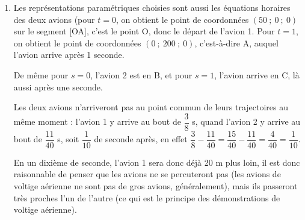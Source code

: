 \documentclass[10pt]{article}
\providecommand{\no}{{\text{n°}}}
\begin{document}
\begin{enumerate}
$\begin{aligned} \begin{cases}	0 = -33 + 120s\\200t = 75\\0 = 44 - 160s\end{cases}
&\iff \begin{cases}	120s = 33\\t = \dfrac{75}{200}\\160s = 44\end{cases}\\
&\iff \begin{cases}	s = \dfrac{33}{120}\\t = \dfrac{3}{8}\\s = \dfrac{44}{160}\end{cases} \\
&\iff \begin{cases}	s = \dfrac{11}{40}\\t = \dfrac{3}{8}\\s = \dfrac{11}{40}\end{cases} \\ \end{aligned}$

Le système a effectivement une unique solution, les deux trajectoires ont donc bien un point commun, qui est le point de paramètre $t = \dfrac{3}{8}$ sur [0A], qui est aussi le point de paramètre $s = \dfrac{11}{40}$ sur [BC], c'est le point de coordonnées $(0~;~75~;~0)$.


\item Les représentations paramétriques choisies sont aussi les équations horaires des deux avions (pour $t = 0$, on obtient le point de coordonnées $(50~;~0~;~0)$ sur le segment [OA], c'est le point O, donc le départ de l'avion 1. Pour $t = 1$, on obtient le point de coordonnées $(0~;~200~;~0)$, c'est-à-dire A, auquel l'avion arrive après 1 seconde.

De même pour $s = 0$, l'avion \no 2 est en B, et pour $s=1$, l'avion arrive en C, là aussi après une seconde.

Les deux avions n'arriveront pas au point commun de leurs trajectoires au même moment : l'avion \no 1 y arrive au bout de $\dfrac{3}{8}$ s, quand l'avion \no 2 y arrive au bout de $\dfrac{11}{40}$ s, soit $\dfrac{1}{10}$ de seconde après, en effet $\dfrac{3}{8} - \dfrac{11}{40} = \dfrac{15}{40} - \dfrac{11}{40} = \dfrac{4}{40} = \dfrac{1}{10}$.

En un dixième de seconde, l'avion \no 1 sera donc déjà 20 m plus loin, il est donc raisonnable de penser que les avions ne se percuteront pas (les avions de voltige aérienne ne sont pas de gros avions, généralement), mais ils passeront très proches l'un de l'autre (ce qui est le principe des démonstrations de voltige aérienne).
\end{enumerate}
\end{document}
